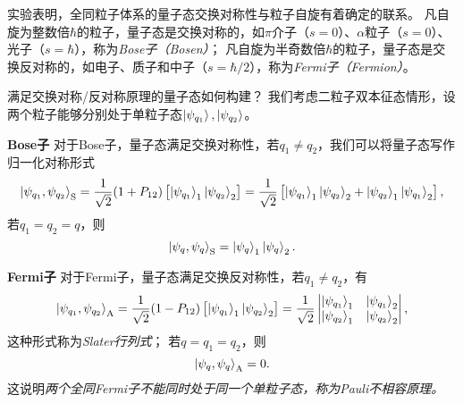 实验表明，全同粒子体系的量子态交换对称性与粒子自旋有着确定的联系。
凡自旋为整数倍$\hbar$的粒子，量子态是交换对称的，如$\pi$介子（$s=0$）、$\alpha$粒子（$s=0$）、光子（$s=\hbar$），称为\emph{Bose子（Bosen）}；
凡自旋为半奇数倍$\hbar$的粒子，量子态是交换反对称的，如电子、质子和中子（$s=\hbar/2$），称为\emph{Fermi子（Fermion）}。

满足交换对称/反对称原理的量子态如何构建？
我们考虑二粒子双本征态情形，设两个粒子能够分别处于单粒子态$\ket{\psi_{q_1}},\ket{\psi_{q_2}}$。

\begin{tcolorbox}
\textbf{Bose子}\quad
对于Bose子，量子态满足交换对称性，若$q_1\neq q_2$，我们可以将量子态写作归一化对称形式
\begin{equation}
    \ket{\psi_{q_1},\psi_{q_2}}_{\mathrm{S}}
    = \frac{1}{\sqrt{2}} (1+P_{12}) \left[\ket{\psi_{q_1}}_1 \ket{\psi_{q_2}}_2\right]
    = \frac{1}{\sqrt{2}} \left[\ket{\psi_{q_1}}_1 \ket{\psi_{q_2}}_2 + \ket{\psi_{q_2}}_1 \ket{\psi_{q_1}}_2\right],
\end{equation}
若$q_1=q_2=q$，则
\begin{equation}
    \ket{\psi_{q},\psi_{q}}_{\mathrm{S}} = \ket{\psi_q}_1 \ket{\psi_q}_2.
\end{equation}
\end{tcolorbox}

\begin{tcolorbox}
\textbf{Fermi子}\quad
对于Fermi子，量子态满足交换反对称性，若$q_1\neq q_2$，有
\begin{equation}
    \ket{\psi_{q_1},\psi_{q_2}}_{\mathrm{A}}
    = \frac{1}{\sqrt{2}} (1-P_{12}) \left[\ket{\psi_{q_1}}_1 \ket{\psi_{q_2}}_2\right]
    = \frac{1}{\sqrt{2}}
    \begin{vmatrix}
        \ket{\psi_{q_1}}_1 & \ket{\psi_{q_1}}_2 \\
        \ket{\psi_{q_2}}_1 & \ket{\psi_{q_2}}_2
    \end{vmatrix},
\end{equation}
这种形式称为\emph{Slater行列式}；
若$q=q_1=q_2$，则
\begin{equation}
    \ket{\psi_q,\psi_q}_{\mathrm{A}} = 0.
\end{equation}
这说明\emph{两个全同Fermi子不能同时处于同一个单粒子态，称为Pauli不相容原理。}
\end{tcolorbox}


